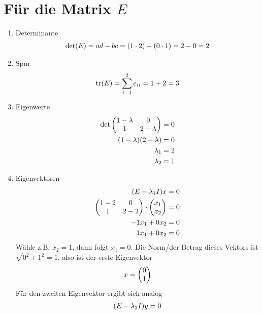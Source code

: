 \documentclass{article}
\DeclareMathOperator{\tr}{tr}
\begin{document}
	\section*{Für die Matrix $E$}
	\begin{enumerate}[label=(\alph*)]
		\item Determinante
		\begin{align}
			\det(E) = ad-bc = (1\cdot 2) - (0\cdot 1) = 2 - 0 = 2 \notag
		\end{align}
		\item Spur
		\begin{align}
			\tr(E) = \sum_{i=1}^{2} e_{ii} = 1 + 2 = 3 \notag
		\end{align}
		\item Eigenwerte
		\begin{align}
			\det\begin{pmatrix}
				1-\lambda & 0 \\ 1 & 2-\lambda
			\end{pmatrix} &= 0 \notag \\
			(1-\lambda)(2-\lambda) &= 0 \notag \\
			\lambda_1 &= 2 \notag \\
			\lambda_2 &= 1 \notag
		\end{align}
		\item Eigenvektoren
		\begin{align}
			(E-\lambda_1I)x &= 0 \notag \\
			\begin{pmatrix}
				1-2 & 0 \\ 1 & 2-2
			\end{pmatrix} \cdot \begin{pmatrix}
				x_1 \\ x_2
			\end{pmatrix} &= 0 \notag \\
			-1x_1+0x_2 &= 0 \notag \\
			1x_1+0x_2 &= 0 \notag
		\end{align}
		Wähle z.B. $x_2=1$, dann folgt $x_1=0$. Die Norm/der Betrag dieses Vektors ist $\sqrt{0^2+1^2}=1$, also ist der erste Eigenvektor
		\begin{align}
			x= \begin{pmatrix}
				0 \\ 1
			\end{pmatrix} \notag
		\end{align}
		Für den zweiten Eigenvektor ergibt sich analog
		\begin{align}
			(E-\lambda_2I)y &= 0 \notag \\

\end{align}
\end{enumerate}
\end{document}
